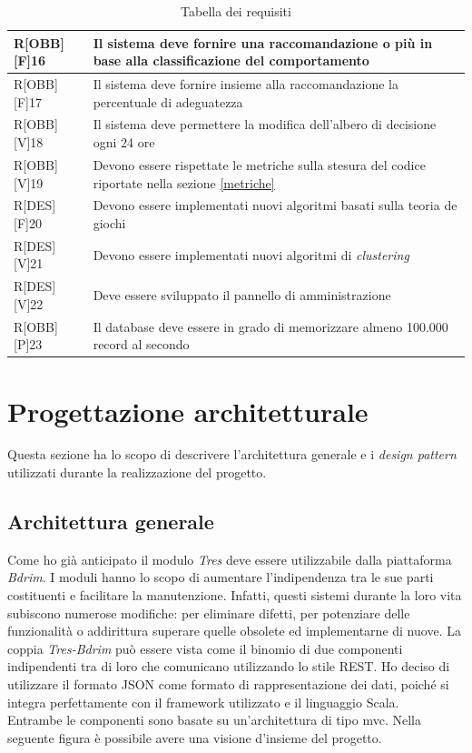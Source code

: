 \newpage
\begin{table}[h]
	\begin{tabular}{|p{}|p{}|}
		\midrule
		R[OBB][F]16 & Il sistema deve fornire una raccomandazione o più in base alla classificazione del comportamento \\ \midrule
		R[OBB][F]17 & Il sistema deve fornire insieme alla raccomandazione la percentuale di adeguatezza \\ \midrule
		R[OBB][V]18 & Il sistema deve permettere la modifica dell'albero di decisione ogni 24 ore \\ \midrule
		R[OBB][V]19 & Devono essere rispettate le metriche sulla stesura del codice riportate nella sezione \ref{metriche} \\ \midrule
		R[DES][F]20 & Devono essere implementati nuovi algoritmi basati sulla teoria de giochi \\ \midrule
		R[DES][V]21 & Devono essere implementati nuovi algoritmi di \textit{clustering} \\ \midrule
		R[DES][V]22 & Deve essere sviluppato il pannello di amministrazione \\ \midrule
		R[OBB][P]23 & Il database deve essere in grado di memorizzare almeno 100.000 record al secondo \\ 
		
		\bottomrule
		
	\end{tabular}
	\caption{Tabella dei requisiti}
\end{table}

\section{Progettazione architetturale}
Questa sezione ha lo scopo di descrivere l'architettura generale e i \textit{design pattern} utilizzati durante la realizzazione del progetto.
\subsection{Architettura generale}
Come ho già anticipato il modulo \textit{Tres} deve essere utilizzabile dalla piattaforma \textit{Bdrim}.  I moduli hanno lo scopo di aumentare l'indipendenza tra le sue parti costituenti e facilitare la manutenzione. Infatti, questi sistemi durante la loro vita subiscono numerose modifiche: per eliminare difetti, per potenziare delle funzionalità o addirittura superare quelle obsolete ed implementarne di nuove. La coppia \textit{Tres-Bdrim} può essere vista come il binomio di due componenti indipendenti tra di loro che comunicano utilizzando lo stile \gls{REST}. Ho deciso di utilizzare il formato \gls{JSON} come formato di rappresentazione dei dati, poiché si integra perfettamente con il \gls{framework} utilizzato e il linguaggio Scala.\\
Entrambe le componenti sono basate su un'architettura di tipo \gls{mvc}. Nella seguente figura è possibile avere una visione d'insieme del progetto.

